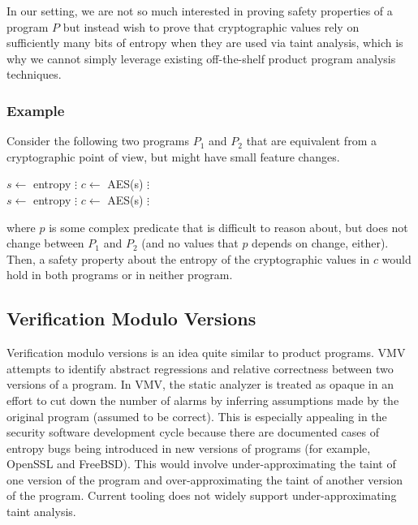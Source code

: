 \documentclass[letterpaper,twocolumn,10pt]{article}
\begin{document}
In our setting, we are not so much interested in proving safety properties of a program $P$ but instead wish to prove that cryptographic values rely on sufficiently many bits of entropy when they are used via taint analysis, 
which is why we cannot simply leverage existing off-the-shelf product program analysis techniques.

\subsubsection{Example}

Consider the following two programs $P_1$ and $P_2$ that are equivalent from a cryptographic point of view, but might have small feature changes. 

\begin{algorithmic}
\State $s \gets$ entropy
\State $\vdots$
\State $c \gets$ AES(s)
\EndIf
\State $\vdots$
\EndFunction
\\
\State $s \gets$ entropy
\State $\vdots$
\State $c \gets$ AES(s)
\EndIf
\State $\vdots$
\EndFunction
\end{algorithmic}

where $p$ is some complex predicate that is difficult to reason about, but does not change between $P_1$ and $P_2$ (and no values that $p$ depends on change, either). Then, a safety property about the entropy of the cryptographic values in $c$ would hold in both programs or in neither program. 

\subsection{Verification Modulo Versions}
Verification modulo versions is an idea quite similar to product programs. VMV attempts to identify abstract regressions and relative correctness between two versions of a program.
In VMV, the static analyzer is treated as opaque in an effort to cut down the number of alarms by inferring assumptions made by the original program (assumed to be correct). This is especially appealing in the security software development cycle because there are documented cases of entropy bugs being introduced in new versions of programs (for example, OpenSSL and FreeBSD). This would involve under-approximating the taint of one version of the program and over-approximating the taint of another version of the program. Current tooling does not widely support under-approximating taint analysis. 
\end{document}
